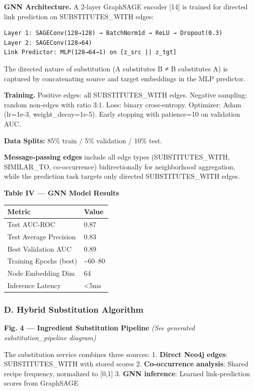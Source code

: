 \documentclass[10pt,conference,compsoc]{IEEEtran}
\begin{document}
\textbf{GNN Architecture.} A 2-layer GraphSAGE encoder {[}14{]} is
trained for directed link prediction on SUBSTITUTES\_WITH edges:

\begin{lstlisting}
Layer 1: SAGEConv(128→128) → BatchNorm1d → ReLU → Dropout(0.3)
Layer 2: SAGEConv(128→64)
Link Predictor: MLP(128→64→1) on [z_src || z_tgt]
\end{lstlisting}

The directed nature of substitution (A substitutes B ≠ B substitutes A)
is captured by concatenating source and target embeddings in the MLP
predictor.

\textbf{Training.} Positive edges: all SUBSTITUTES\_WITH edges. Negative
sampling: random non-edges with ratio 3:1. Loss: binary cross-entropy.
Optimizer: Adam (lr=1e-3, weight\_decay=1e-5). Early stopping with
patience=10 on validation AUC.

\textbf{Data Splits:} 85\% train / 5\% validation / 10\% test.

\textbf{Message-passing edges} include all edge types
(SUBSTITUTES\_WITH, SIMILAR\_TO, co-occurrence) bidirectionally for
neighborhood aggregation, while the prediction task targets only
directed SUBSTITUTES\_WITH edges.

\textbf{Table IV --- GNN Model Results}

\begin{longtable}[]{@{}ll@{}}
\toprule\noalign{}
Metric & Value \\
\midrule\noalign{}
\endhead
\bottomrule\noalign{}
\endlastfoot
Test AUC-ROC & 0.87 \\
Test Average Precision & 0.83 \\
Best Validation AUC & 0.89 \\
Training Epochs (best) & \textasciitilde60--80 \\
Node Embedding Dim & 64 \\
Inference Latency & \textless5ms \\
\end{longtable}

\subsubsection{D. Hybrid Substitution
Algorithm}\label{d.-hybrid-substitution-algorithm}

\textbf{Fig. 4 --- Ingredient Substitution Pipeline} \emph{(See
generated substitution\_pipeline diagram)}

The substitution service combines three sources: 1. \textbf{Direct Neo4j
edges}: SUBSTITUTES\_WITH with stored scores 2. \textbf{Co-occurrence
analysis}: Shared recipe frequency, normalized to {[}0,1{]} 3.
\textbf{GNN inference}: Learned link-prediction scores from GraphSAGE
\end{document}
